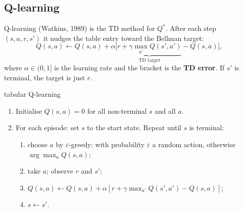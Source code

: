 \documentclass[11pt]{article}
\begin{document}
\subsection{Q-learning}
Q-learning (Watkins, 1989) is the TD method for $Q^*$. After each step $(s,a,r,s')$ it nudges the table entry toward the Bellman target:
\[Q(s,a)\leftarrow Q(s,a)+\alpha\Big[\underbrace{r+\gamma\max_{a'}Q(s',a')}_{\text{TD target}}-Q(s,a)\Big],\]
where $\alpha\in(0,1]$ is the learning rate and the bracket is the \textbf{TD error}. If $s'$ is terminal, the target is just $r$.
\begin{algo}{tabular Q-learning}
\begin{enumerate}[leftmargin=1.5em]
\item Initialise $Q(s,a)=0$ for all non-terminal $s$ and all $a$.
\item For each episode: set $s$ to the start state. Repeat until $s$ is terminal:
\begin{enumerate}[leftmargin=1.2em]
\item choose $a$ by $\varepsilon$-greedy: with probability $\varepsilon$ a random action, otherwise $\arg\max_aQ(s,a)$;
\item take $a$; observe $r$ and $s'$;
\item $Q(s,a)\leftarrow Q(s,a)+\alpha[r+\gamma\max_{a'}Q(s',a')-Q(s,a)]$;
\item $s\leftarrow s'$.
\end{enumerate}
\end{enumerate}
\end{algo}
\end{document}
